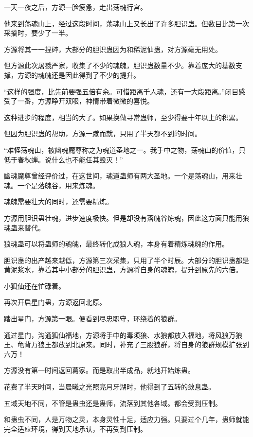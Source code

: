 
\begin{this_body}

一天一夜之后，方源一脸疲惫，走出荡魂行宫。

他来到荡魂山上，经过这段时间，荡魂山上又长出了许多胆识蛊。但数目比第一次采摘时，要少了一半。

方源将其一一捏碎，大部分的胆识蛊因为和稀泥仙蛊，对方源毫无用处。

但方源此次屠戮严家，收集了不少的魂魄，胆识蛊数量不少。靠着庞大的基数支撑，方源的魂魄还是因此得到了不少的提升。

“这样的强度，比先前要强五倍有余。可惜距离千人魂，还有一大段距离。”闭目感受了一番，方源睁开双眼，神情带着微微的喜悦。

这种进步的程度，相当的大了。如果换做寻常蛊师，至少得要十年以上的积累。

但因为胆识蛊的帮助，方源一蹴而就，只用了半天都不到的时间。

“难怪荡魂山，被幽魂魔尊称之为魂道圣地之一。我手中之物，荡魂山的价值，只低于春秋蝉。说什么也不能任其毁灭！”

幽魂魔尊曾经评价过，在这世间，魂道蛊师有两大圣地。一个是荡魂山，用来壮魂。一个是落魄谷，用来炼魂。

魂魄需要壮大的同时，还需要精炼。

方源用胆识蛊壮魂，进步速度极快。但是却没有落魄谷炼魂，因此这方面只能用狼魂蛊来替代。

狼魂蛊可以将蛊师的魂魄，最终转化成狼人魂，本身有着精炼魂魄的作用。

胆识蛊的出产越来越低，方源第三次采集，只用了半个时辰。大部分的胆识蛊都是黄泥浆水，靠着其中小部分的胆识蛊，方源将自身的魂魄，提升到原先的六倍。

小狐仙还在忙碌着。

再次开启星门蛊，方源返回北原。

踏出星门，方源第一眼。便看到尽忠职守，环绕着的狼群。

通过星门，沟通狐仙福地，方源将手中的毒须狼、水狼都放入福地，将风狼万狼王、龟背万狼王都放到北原来。同时，补充了三股狼群，将自身的狼群规模扩张到六万！

方源没有第一时间返回葛家。而是取出半成品，就地开始炼蛊。

花费了半天时间，当晨曦之光照亮月牙湖时，他得到了五转的敛息蛊。

五域天地不同，不管是蛊虫还是蛊师，流落到其他各域。都会受到压制。

和蛊虫不同，人是万物之灵，本身灵性十足，适应力强。只要过个几年，蛊师就能完全适应环境，得到天地承认，不再受到压制。


\end{this_body}
